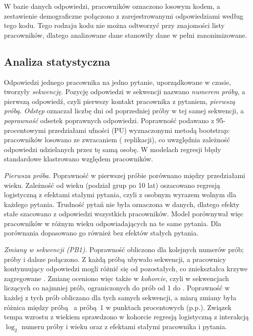 W bazie danych odpowiedzi, pracowników oznaczono losowym kodem, a zestawienie demograficzne połączono z zarejestrowanymi odpowiedziami według
tego kodu. Tego rodzaju kodu nie można odtworzyć przy znajomości listy pracowników, dlatego analizowane dane
stanowiły dane w pełni zanonimizowane.

\subsection{Analiza statystyczna}
\label{sec:analiza}
Odpowiedzi jednego pracownika na jedno pytanie, uporządkowane w czasie, tworzyły \emph{sekwencję}.
Pozycję odpowiedzi w sekwencji nazwano \emph{numerem próby}, a pierwszą odpowiedź, czyli pierwszy
kontakt pracownika z pytaniem, \emph{pierwszą próbą}. \emph{Odstęp} oznaczał liczbę dni od poprzedniej
próby w tej samej sekwencji, a \emph{poprawność} odsetek poprawnych odpowiedzi. Poprawność podawano
z 95-procentowymi przedziałami ufności (PU) wyznaczonymi metodą bootstrap: pracowników losowano ze
zwracaniem (\BootReps{} replikacji), co uwzględnia zależność odpowiedzi udzielanych przez tę samą osobę.
W modelach regresji błędy standardowe klastrowano względem pracowników.

\emph{Pierwsza próba.} Poprawność w pierwszej próbie porównano między przedziałami wieku. Zależność od
wieku (podział grup po 10 lat) oszacowano regresją logistyczną z efektami stałymi pytania, czyli z osobnym wyrazem
wolnym dla każdego pytania. Trudność pytań nie była oznaczona w danych, dlatego efekty stałe szacowano
z odpowiedzi wszystkich pracowników. Model porównywał więc pracowników w różnym wieku odpowiadających
na te same pytania. Dla porównania dopasowano go również bez efektów stałych pytania.

\emph{Zmiany w sekwencji (PB1).} Poprawność obliczono dla kolejnych numerów prób; próby
\MaxAttemptPooled{} i dalsze połączono. Z każdą próbą ubywało sekwencji, a pracownicy kontynuujący
odpowiedzi mogli różnić się od pozostałych, co zniekształca krzywe zagregowane \citep{murray2013}.
Zmianę oceniono więc także w \emph{kohorcie}, czyli w sekwencjach liczących co najmniej \CohortK{}
prób, ograniczonych do prób od 1 do \CohortK{}. Poprawność w każdej z tych prób obliczano dla tych
samych sekwencji, a miarą zmiany była różnica między próbą~\CohortK{} a próbą~1 w punktach
procentowych (p.p.). 
Związek tempa wzrostu z wiekiem sprawdzono w kohorcie regresją logistyczną z interakcją $\log_2$
numeru próby i wieku oraz z efektami stałymi pracownika i pytania.

